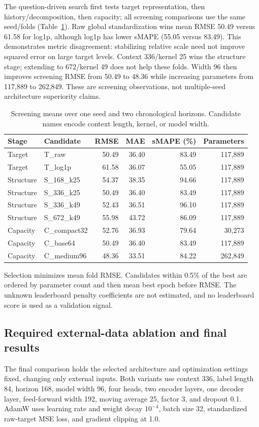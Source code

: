 The question-driven search first tests target representation, then history/decomposition, then capacity; all screening comparisons use the same seed/folds (Table~\ref{tab:t2screen}). Raw global standardization wins mean RMSE 50.49 versus 61.58 for log1p, although log1p has lower sMAPE (55.05 versus 83.49). This demonstrates metric disagreement: stabilizing relative scale need not improve squared error on large target levels. Context 336/kernel 25 wins the structure stage; extending to 672/kernel 49 does not help these folds. Width 96 then improves screening RMSE from 50.49 to 48.36 while increasing parameters from 117,889 to 262,849. These are screening observations, not multiple-seed architecture superiority claims.

\begin{table}[htbp]
\centering\small
\caption{Screening means over one seed and two chronological horizons. Candidate names encode context length, kernel, or model width.}\label{tab:t2screen}
\begin{tabular}{llrrrr}
\toprule
Stage & Candidate & RMSE & MAE & sMAPE (\%) & Parameters \\
\midrule
Target & T\_raw & 50.49 & 36.40 & 83.49 & 117,889 \\
Target & T\_log1p & 61.58 & 36.07 & 55.05 & 117,889 \\
Structure & S\_168\_k25 & 54.37 & 38.35 & 94.66 & 117,889 \\
Structure & S\_336\_k25 & 50.49 & 36.40 & 83.49 & 117,889 \\
Structure & S\_336\_k49 & 52.43 & 36.51 & 96.10 & 117,889 \\
Structure & S\_672\_k49 & 55.98 & 43.72 & 86.09 & 117,889 \\
Capacity & C\_compact32 & 52.76 & 36.93 & 79.64 & 30,273 \\
Capacity & C\_base64 & 50.49 & 36.40 & 83.49 & 117,889 \\
Capacity & C\_medium96 & 48.36 & 33.51 & 84.22 & 262,849 \\
\bottomrule
\end{tabular}
\end{table}

Selection minimizes mean fold RMSE. Candidates within 0.5\% of the best are ordered by parameter count and then mean best epoch before RMSE. The unknown leaderboard penalty coefficients are not estimated, and no leaderboard score is used as a validation signal.

\subsection*{Required external-data ablation and final results}
The final comparison holds the selected architecture and optimization settings fixed, changing only external inputs. Both variants use context 336, label length 84, horizon 168, model width 96, four heads, two encoder layers, one decoder layer, feed-forward width 192, moving average 25, factor 3, and dropout 0.1. AdamW uses learning rate and weight decay $10^{-4}$, batch size 32, standardized raw-target MSE loss, and gradient clipping at 1.0.

